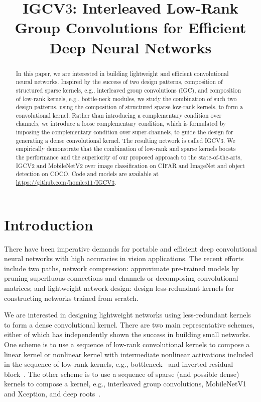 \documentclass{bmvc2k}
\title{IGCV$3$: Interleaved Low-Rank Group Convolutions
	for Efficient Deep Neural Networks}
\begin{document}
	
	\maketitle
	
	\begin{abstract}
		In this paper, we are interested in building lightweight and
		efficient convolutional neural networks.
		Inspired by the success of two design patterns,
		composition of structured sparse kernels, e.g., interleaved group convolutions (IGC),
		and composition of low-rank kernels, e.g., bottle-neck modules,
		we study the combination of such two design patterns, using the composition of structured sparse low-rank kernels,
		to form a convolutional kernel.
		Rather than introducing a complementary condition over channels,
		we introduce a loose complementary condition,
		which is formulated by imposing the complementary condition
		over super-channels,
		to guide the design for
		generating a dense convolutional kernel.
		The resulting network is called IGCV$3$.
		We empirically demonstrate that the combination of low-rank and sparse kernels boosts the performance
		and the superiority of our proposed approach
		to the state-of-the-arts, IGCV$2$ and MobileNetV$2$
		over image classification on CIFAR and ImageNet
		and object detection on COCO. Code and models are available at \url{https://github.com/homles11/IGCV3}. 
	\end{abstract}
	
	\section{Introduction}
	\label{sec:intro}
	
	There have been imperative demands for portable and efficient deep convolutional neural networks
	with high accuracies in vision applications.
	The recent efforts include two paths,
	network compression:
	approximate pre-trained models
	by pruning superfluous connections and channels
	or decomposing convolutional matrices;
	and lightweight network design:
	design less-redundant kernels for constructing networks
	trained from scratch. 
	
	We are interested
	in designing lightweight networks
	using less-redundant kernels to form a dense convolutional kernel.
	There are two main representative schemes,
	either of which has independently shown the success in building small networks.
	One scheme is to use a sequence of low-rank convolutional kernels to compose a linear kernel
	or nonlinear kernel with intermediate nonlinear activations included in the sequence of low-rank kernels,
	e.g., bottleneck~\cite{he2016deep} and inverted residual block~\cite{sandler2018inverted}.
	The other scheme is to use a sequence of sparse (and possible dense) kernels 
	to compose a kernel,
	e.g., interleaved group convolutions,
	MobileNetV1 and Xception,
	and deep roots~\cite{zhang2017interleaved,howard2017mobilenets,Chollet16a,IoannouRCC16}.
	
\end{document}
